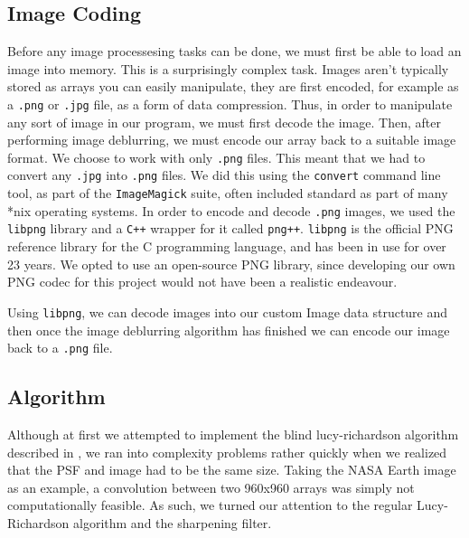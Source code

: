\documentclass{article}
\begin{document}
\subsection{Image Coding}
Before any image processesing tasks can be done, we must first be able to load an image into memory. This is a surprisingly complex task. Images aren't typically stored as arrays you can easily manipulate, they are first encoded, for example as a \texttt{.png} or \texttt{.jpg} file, as a form of data compression. Thus, in order to manipulate any sort of image in our program, we must first decode the image. Then, after performing image deblurring, we must encode our array back to a suitable image format. We choose to work with only \texttt{.png} files. This meant that we had to convert any \texttt{.jpg} into \texttt{.png} files. We did this using the \texttt{convert} command line tool, as part of the \texttt{ImageMagick} suite, often included standard as part of many *nix operating systems. In order to encode and decode \texttt{.png} images, we used the \texttt{libpng} library and a \texttt{C++} wrapper for it called \texttt{png++}. \texttt{libpng} is the official PNG reference library for the C programming language, and has been in use for over 23 years. We opted to use an open-source PNG library, since developing our own PNG codec for this project would not have been a realistic endeavour. 

Using \texttt{libpng}, we can decode images into our custom Image data structure and then once the image deblurring algorithm has finished we can encode our image back to a \texttt{.png} file. 

\subsection{Algorithm} \label{section:our_Algo}
Although at first we attempted to implement the blind lucy-richardson algorithm described in \cite{LRalgo}, we ran into complexity problems rather quickly when we realized that the PSF and image had to be the same size. Taking the NASA Earth image as an example, a convolution between two 960x960 arrays was simply not computationally feasible. As such, we turned our attention to the regular Lucy-Richardson algorithm and the sharpening filter.
\end{document}
